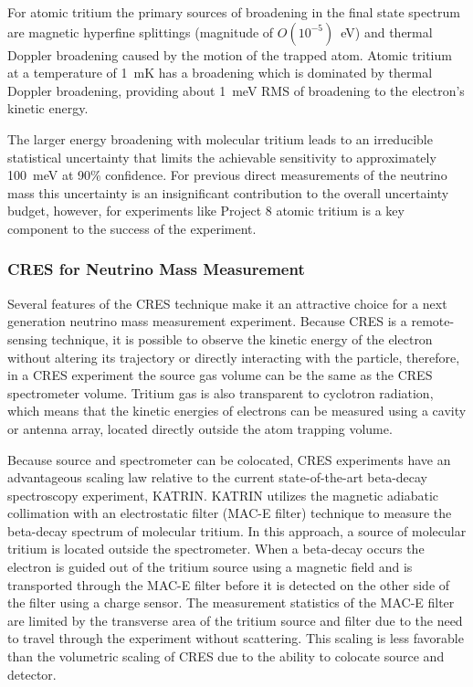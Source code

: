 For atomic tritium the primary sources of broadening in the final state spectrum are magnetic hyperfine splittings (magnitude of $O(10^{-5})$~eV) and thermal Doppler broadening caused by the motion of the trapped atom. Atomic tritium at a temperature of 1~mK has a broadening which is dominated by thermal Doppler broadening, providing about 1~meV RMS of broadening to the electron's kinetic energy.

The larger energy broadening with molecular tritium leads to an irreducible statistical uncertainty that limits the achievable sensitivity to approximately 100~meV at 90\% confidence. For previous direct measurements of the neutrino mass this uncertainty is an insignificant contribution to the overall uncertainty budget, however, for experiments like Project 8 atomic tritium is a key component to the success of the experiment.

\subsubsection*{CRES for Neutrino Mass Measurement}

Several features of the CRES technique make it an attractive choice for a next generation neutrino mass measurement experiment. Because CRES is a remote-sensing technique, it is possible to observe the kinetic energy of the electron without altering its trajectory or directly interacting with the particle, therefore, in a CRES experiment the source gas volume can be the same as the CRES spectrometer volume. Tritium gas is also transparent to cyclotron radiation, which means that the kinetic energies of electrons can be measured using a cavity or antenna array, located directly outside the atom trapping volume. 

Because source and spectrometer can be colocated, CRES experiments have an advantageous scaling law relative to the current state-of-the-art beta-decay spectroscopy experiment, KATRIN. KATRIN utilizes the magnetic adiabatic collimation with an electrostatic filter (MAC-E filter) technique to measure the beta-decay spectrum of molecular tritium. In this approach, a source of molecular tritium is located outside the spectrometer. When a beta-decay occurs the electron is guided out of the tritium source using a magnetic field and is transported through the MAC-E filter before it is detected on the other side of the filter using a charge sensor. The measurement statistics of the MAC-E filter are limited by the transverse area of the tritium source and filter due to the need to travel through the experiment without scattering. This scaling is less favorable than the volumetric scaling of CRES due to the ability to colocate source and detector.

